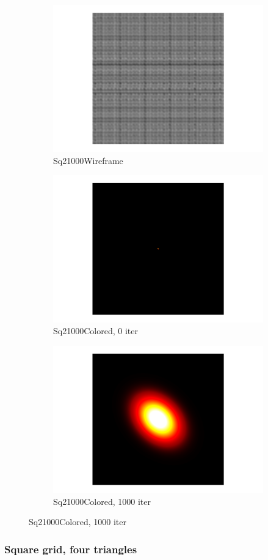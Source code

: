 \documentclass[openany]{book}
\begin{document}
\begin{figure}
	\bigskip
	\begin{subfigure}{.3\linewidth}
		\centering
		\includegraphics[width=0.30\linewidth]{data/synthetic_meshes/square_tesselation_2tri_Dirac_delta_100_v40401_f80000_wireframe.png}
		\caption{Sq21000Wireframe}\label{fig:sq2.c}
	\end{subfigure}
	\begin{subfigure}{.3\linewidth}
		\centering
		\includegraphics[width=0.30\linewidth]{data/synthetic_meshes/square_tesselation_2tri_Dirac_delta_100_v40401_f80000_funcvals_0iter.png}
		\caption{Sq21000Colored, 0 iter}\label{fig:sq2.d}
	\end{subfigure}
	\begin{subfigure}{.3\linewidth}
		\centering
		\includegraphics[width=0.30\linewidth]{data/synthetic_meshes/square_tesselation_2tri_Dirac_delta_100_v40401_f80000_funcvals_1000iter.png}
		\caption{Sq21000Colored, 1000 iter}\label{fig:sq2.e}
	\end{subfigure}
\end{figure}

\subsubsection{Square grid, four triangles}
\end{document}

